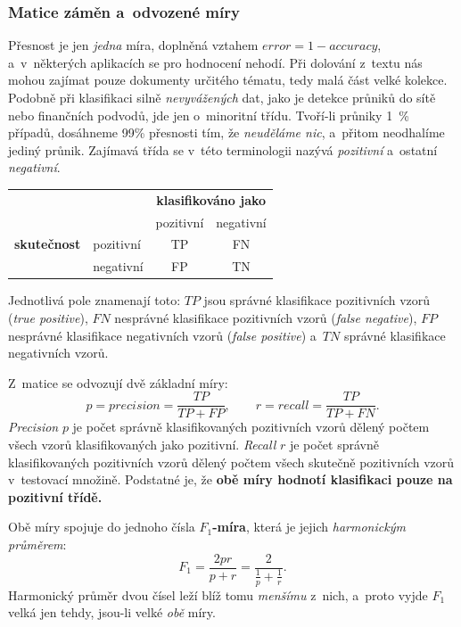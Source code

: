 \documentclass[11pt,a4paper]{article}
\theoremstyle{definition}
\begin{document}
\subsubsection{Matice záměn a~odvozené míry}

Přesnost je jen \emph{jedna} míra, doplněná vztahem $\mathit{error}=1-\mathit{accuracy}$,
a~v~některých aplikacích se pro hodnocení nehodí. Při dolování z~textu nás mohou zajímat pouze
dokumenty určitého tématu, tedy malá část velké kolekce. Podobně při klasifikaci silně
\emph{nevyvážených} dat, jako je detekce průniků do sítě nebo finančních podvodů, jde jen
o~minoritní třídu. Tvoří-li průniky 1~\% případů, dosáhneme 99\% přesnosti tím, že
\emph{neuděláme nic}, a~přitom neodhalíme jediný průnik. Zajímavá třída se v~této terminologii
nazývá \emph{pozitivní} a~ostatní \emph{negativní}.

\begin{defbox}
\begin{center}
\small
\begin{tabular}{@{}llcc@{}}
\toprule
& & \multicolumn{2}{c}{\textbf{klasifikováno jako}} \\
& & pozitivní & negativní \\
\midrule
\textbf{skutečnost} & pozitivní & TP & FN \\
                    & negativní & FP & TN \\
\bottomrule
\end{tabular}
\end{center}
Jednotlivá pole znamenají toto: $TP$ jsou správné klasifikace pozitivních vzorů (\emph{true
positive}), $FN$ nesprávné klasifikace pozitivních vzorů (\emph{false negative}), $FP$
nesprávné klasifikace negativních vzorů (\emph{false positive}) a~$TN$ správné klasifikace
negativních vzorů.

Z~matice se odvozují dvě základní míry:
\[ p=\mathit{precision}=\frac{TP}{TP+FP},\qquad r=\mathit{recall}=\frac{TP}{TP+FN}. \]
\emph{Precision} $p$ je počet správně klasifikovaných pozitivních vzorů dělený počtem všech
vzorů klasifikovaných jako pozitivní. \emph{Recall} $r$ je počet správně klasifikovaných
pozitivních vzorů dělený počtem všech skutečně pozitivních vzorů v~testovací množině. Podstatné
je, že \textbf{obě míry hodnotí klasifikaci pouze na pozitivní třídě.}

Obě míry spojuje do jednoho čísla \textbf{$F_1$-míra}, která je jejich \emph{harmonickým
průměrem}:
\[ F_1=\frac{2pr}{p+r}=\frac{2}{\frac1p+\frac1r}. \]
Harmonický průměr dvou čísel leží blíž tomu \emph{menšímu} z~nich, a~proto vyjde $F_1$ velká
jen tehdy, jsou-li velké \emph{obě} míry.
\end{defbox}
\end{document}
